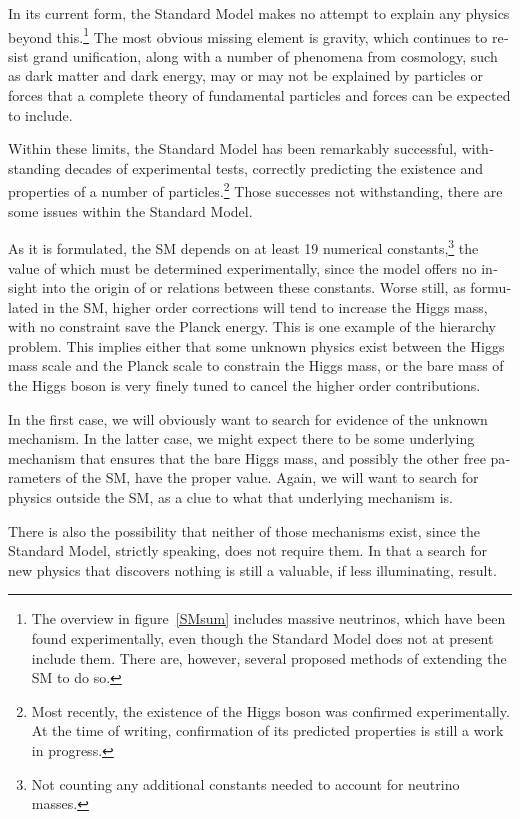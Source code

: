 \begin{english}
In its current form, the Standard Model makes no attempt to explain any physics beyond this.\footnote{The overview in figure~\ref{SMsum} includes massive neutrinos, which have been found experimentally, even though the Standard Model does not at present include them. There are, however, several proposed methods of extending the SM to do so.} The most obvious missing element is gravity, which continues to resist grand unification, along with a number of phenomena from cosmology, such as dark matter and dark energy, may or may not be explained by particles or forces that a complete theory of fundamental particles and forces can be expected to include.

Within these limits, the Standard Model has been remarkably successful, withstanding decades of experimental tests, correctly predicting the existence and properties of a number of particles.\footnote{Most recently, the existence of the Higgs boson was confirmed experimentally. At the time of writing, confirmation of its predicted properties is still a work in progress.} Those successes not withstanding, there are some issues within the Standard Model.

As it is formulated, the SM depends on at least 19 numerical constants,\footnote{Not counting any additional constants needed to account for neutrino masses.} the value of which must be determined experimentally, since the model offers no insight into the origin of or relations between these constants. Worse still, as formulated in the SM, higher order corrections will tend to increase the Higgs mass, with no constraint save the Planck energy. This is one example of the hierarchy problem. This implies either that some unknown physics exist between the Higgs mass scale and the Planck scale to constrain the Higgs mass, or the bare mass of the Higgs boson is very finely tuned to cancel the higher order contributions.

In the first case, we will obviously want to search for evidence of the unknown mechanism. In the latter case, we might expect there to be some underlying mechanism that ensures that the bare Higgs mass, and possibly the other free parameters of the SM, have the proper value. Again, we will want to search for physics outside the SM, as a clue to what that underlying mechanism is.

There is also the possibility that neither of those mechanisms exist, since the Standard Model, strictly speaking, does not require them. In that a search for new physics that discovers nothing is still a valuable, if less illuminating, result.


\end{english}
